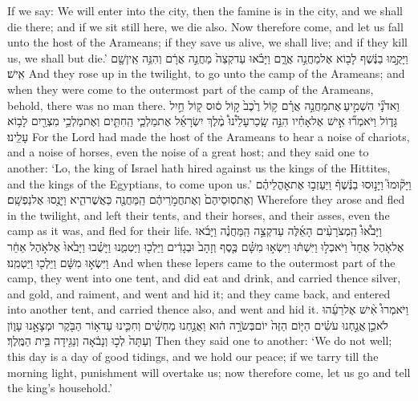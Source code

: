 {If we say: We will enter into the city, then the famine is in the city, and we shall die there; and if we sit still here, we die also. Now therefore come, and let us fall unto the host of the Arameans; if they save us alive, we shall live; and if they kill us, we shall but die.’}
{וַיָּקֻ֣מוּ בַנֶּ֔שֶׁף לָב֖וֹא אֶל\maqqaf מַחֲנֵ֣ה אֲרָ֑ם וַיָּבֹ֗אוּ עַד\maqqaf קְצֵה֙ מַחֲנֵ֣ה אֲרָ֔ם וְהִנֵּ֥ה אֵֽין\maqqaf שָׁ֖ם אִֽישׁ׃}
{And they rose up in the twilight, to go unto the camp of the Arameans; and when they were come to the outermost part of the camp of the Arameans, behold, there was no man there.}
{וַאדֹנָ֞י הִשְׁמִ֣יעַ \legarmeh  אֶת\maqqaf מַחֲנֵ֣ה אֲרָ֗ם ק֥וֹל רֶ֙כֶב֙ ק֣וֹל ס֔וּס ק֖וֹל חַ֣יִל גָּד֑וֹל וַיֹּאמְר֞וּ אִ֣ישׁ אֶל\maqqaf אָחִ֗יו הִנֵּ֣ה שָֽׂכַר\maqqaf עָלֵ֩ינוּ֩ מֶ֨לֶךְ יִשְׂרָאֵ֜ל אֶת\maqqaf מַלְכֵ֧י הַֽחִתִּ֛ים וְאֶת\maqqaf מַלְכֵ֥י מִצְרַ֖יִם לָב֥וֹא עָלֵֽינוּ׃}
{For the Lord had made the host of the Arameans to hear a noise of chariots, and a noise of horses, even the noise of a great host; and they said one to another: ‘Lo, the king of Israel hath hired against us the kings of the Hittites, and the kings of the Egyptians, to come upon us.’}
{וַיָּק֘וּמוּ֮ וַיָּנ֣וּסוּ בַנֶּ֒שֶׁף֒ וַיַּעַזְב֣וּ אֶת\maqqaf אׇהֳלֵיהֶ֗ם וְאֶת\maqqaf סֽוּסֵיהֶם֙ וְאֶת\maqqaf חֲמֹ֣רֵיהֶ֔ם הַֽמַּחֲנֶ֖ה כַּאֲשֶׁר\maqqaf הִ֑יא וַיָּנֻ֖סוּ אֶל\maqqaf נַפְשָֽׁם׃}
{Wherefore they arose and fled in the twilight, and left their tents, and their horses, and their asses, even the camp as it was, and fled for their life.}
{וַיָּבֹ֩אוּ֩ הַֽמְצֹרָעִ֨ים הָאֵ֜לֶּה עַד\maqqaf קְצֵ֣ה הַֽמַּחֲנֶ֗ה וַיָּבֹ֜אוּ אֶל\maqqaf אֹ֤הֶל אֶחָד֙ וַיֹּאכְל֣וּ וַיִּשְׁתּ֔וּ וַיִּשְׂא֣וּ מִשָּׁ֗ם כֶּ֤סֶף וְזָהָב֙ וּבְגָדִ֔ים וַיֵּלְכ֖וּ וַיַּטְמִ֑נוּ וַיָּשֻׁ֗בוּ וַיָּבֹ֙אוּ֙ אֶל\maqqaf אֹ֣הֶל אַחֵ֔ר וַיִּשְׂא֣וּ מִשָּׁ֔ם וַיֵּלְכ֖וּ וַיַּטְמִֽנוּ׃}
{And when these lepers came to the outermost part of the camp, they went into one tent, and did eat and drink, and carried thence silver, and gold, and raiment, and went and hid it; and they came back, and entered into another tent, and carried thence also, and went and hid it.}
{וַיֹּאמְרוּ֩ אִ֨ישׁ אֶל\maqqaf רֵעֵ֜הוּ לֹא\maqqaf כֵ֣ן \legarmeh  אֲנַ֣חְנוּ עֹשִׂ֗ים הַיּ֤וֹם הַזֶּה֙ יוֹם\maqqaf בְּשֹׂרָ֣ה ה֔וּא וַאֲנַ֣חְנוּ מַחְשִׁ֗ים וְחִכִּ֛ינוּ עַד\maqqaf א֥וֹר הַבֹּ֖קֶר וּמְצָאָ֣נוּ עָו֑וֹן וְעַתָּה֙ לְכ֣וּ וְנָבֹ֔אָה וְנַגִּ֖ידָה בֵּ֥ית הַמֶּֽלֶךְ׃}
{Then they said one to another: ‘We do not well; this day is a day of good tidings, and we hold our peace; if we tarry till the morning light, punishment will overtake us; now therefore come, let us go and tell the king’s household.’}
